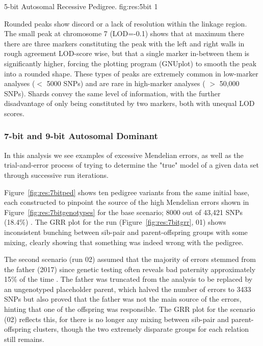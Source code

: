 {5-bit Autosomal Recessive Pedigree.}
{fig:res:5bit}
{1}
{}

Rounded peaks show discord or a lack of resolution within the linkage region. The small peak at chromosome 7 (LOD=-0.1) shows that at maximum there there are three markers constituting the peak with the left and right walls in rough agreement LOD-score wise, but that a single marker in-between them is significantly higher, forcing the plotting program (GNUplot) to smooth the peak into a rounded shape. These types of peaks are extremely common in low-marker analyses ($<$ 5000 SNPs) and are rare in high-marker analyses ( $>$ 50,000 SNPs). Shards convey the same level of information, with the further disadvantage of only being constituted by two markers, both with unequal LOD scores.

\subsubsection*{7-bit and 9-bit Autosomal Dominant}

In this analysis we see examples of excessive Mendelian errors, as well as the trial-and-error process of trying to determine the "true" model of a given data set through successive run iterations.

Figure~\ref{fig:res:7bitped} shows ten pedigree variants from the same initial base, each constructed to pinpoint the source of the high Mendelian errors shown in Figure~\ref{fig:res:7bitgenotypes} for the base scenario; 8000 out of 43,421 SNPs (18.4\%) . The GRR plot for the run (Figure~\ref{fig:res:7bitgrr}, 01) shows inconsistent bunching between sib-pair and parent-offspring groups with some mixing, clearly showing that something was indeed wrong with the pedigree.

The second scenario (run 02) assumed that the majority of errors stemmed from the father (2017) since genetic testing often reveals bad paternity approximately 15\% of the time \cite{fenner2005cross}. The father was truncated from the analysis to be replaced by an ungenotyped placeholder parent, which halved the number of errors to 3433 SNPs but also proved that the father was not the main source of the errors, hinting that one of the offspring was responsible. The GRR plot for the scenario (02) reflects this, for there is no longer any mixing between sib-pair and parent-offspring clusters, though the two extremely disparate groups for each relation still remains.


